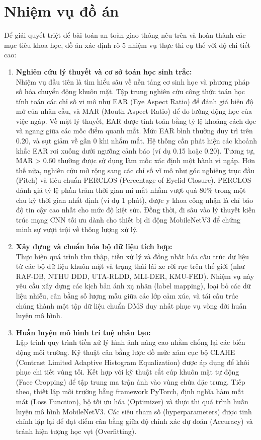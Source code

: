 \documentclass[../DoAn.tex]{subfiles}
\begin{document}
\section{Nhiệm vụ đồ án}
\label{section:1.3}
Để giải quyết triệt để bài toán an toàn giao thông nêu trên và hoàn thành các mục tiêu khoa học, đồ án xác định rõ 5 nhiệm vụ thực thi cụ thể với độ chi tiết cao:
\begin{enumerate}
    \item \textbf{Nghiên cứu lý thuyết và cơ sở toán học sinh trắc:}\\
    Nhiệm vụ đầu tiên là tìm hiểu sâu về nền tảng cơ sinh học và phương pháp số hóa chuyển động khuôn mặt. Tập trung nghiên cứu công thức toán học tính toán các chỉ số vi mô như EAR (Eye Aspect Ratio) để đánh giá biên độ mở của nhãn cầu, và MAR (Mouth Aspect Ratio) để đo lường động học của việc ngáp. Về mặt lý thuyết, EAR được tính toán bằng tỷ lệ khoảng cách dọc và ngang giữa các mốc điểm quanh mắt. Mức EAR bình thường duy trì trên 0.20, và sụt giảm về gần 0 khi nhắm mắt. Hệ thống cần phát hiện các khoảnh khắc EAR rơi xuống dưới ngưỡng cảnh báo (ví dụ 0.15 hoặc 0.20). Tương tự, MAR > 0.60 thường được sử dụng làm mốc xác định một hành vi ngáp. Hơn thế nữa, nghiên cứu mở rộng sang các chỉ số vĩ mô như góc nghiêng trục đầu (Pitch) và tiêu chuẩn PERCLOS (Percentage of Eyelid Closure). PERCLOS đánh giá tỷ lệ phần trăm thời gian mí mắt nhắm vượt quá 80\% trong một chu kỳ thời gian nhất định (ví dụ 1 phút), được y khoa công nhận là chỉ báo độ tin cậy cao nhất cho mức độ kiệt sức. Đồng thời, đi sâu vào lý thuyết kiến trúc mạng CNN tối ưu dành cho thiết bị di động MobileNetV3 để chứng minh sự vượt trội về thông lượng xử lý.
    
    \item \textbf{Xây dựng và chuẩn hóa bộ dữ liệu tích hợp:}\\
    Thực hiện quá trình thu thập, tiền xử lý và đồng nhất hóa cấu trúc dữ liệu từ các bộ dữ liệu khuôn mặt và trạng thái lái xe rời rạc trên thế giới (như RAF-DB, NTHU DDD, UTA-RLDD, MLI-DER, KMU-FED). Nhiệm vụ này yêu cầu xây dựng các kịch bản ánh xạ nhãn (label mapping), loại bỏ các dữ liệu nhiễu, cân bằng số lượng mẫu giữa các lớp cảm xúc, và tái cấu trúc chúng thành một tập dữ liệu chuẩn DMS duy nhất phục vụ vòng đời huấn luyện mô hình.
    
    \item \textbf{Huấn luyện mô hình trí tuệ nhân tạo:}\\
    Lập trình quy trình tiền xử lý hình ảnh nâng cao nhằm chống lại các biến động môi trường. Kỹ thuật cân bằng lược đồ mức xám cục bộ CLAHE (Contrast Limited Adaptive Histogram Equalization) được áp dụng để khôi phục chi tiết vùng tối. Kết hợp với kỹ thuật cắt cúp khuôn mặt tự động (Face Cropping) để tập trung ma trận ảnh vào vùng chứa đặc trưng. Tiếp theo, thiết lập môi trường bằng framework PyTorch, định nghĩa hàm mất mát (Loss Function), bộ tối ưu hóa (Optimizer) và thực thi quá trình huấn luyện mô hình MobileNetV3. Các siêu tham số (hyperparameters) được tinh chỉnh lặp lại để đạt điểm cân bằng giữa độ chính xác dự đoán (Accuracy) và tránh hiện tượng học vẹt (Overfitting).
    

\end{enumerate}
\end{document}
